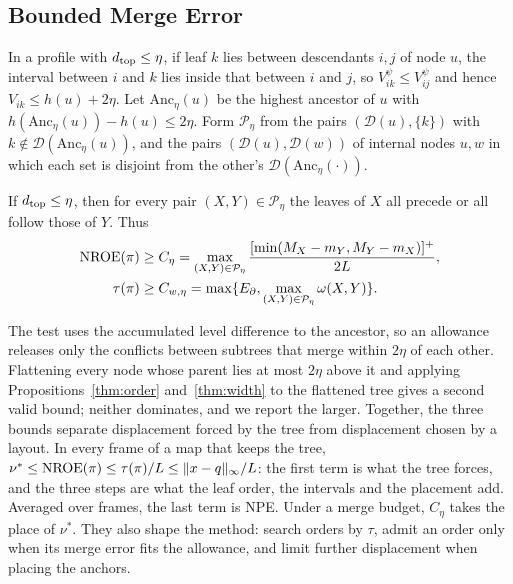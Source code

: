 \subsection{Bounded Merge Error}
In a profile with $d_{\mathrm{top}}\le\eta$, if leaf $k$ lies between descendants $i,j$ of node $u$, the interval between $i$ and $k$ lies inside that between $i$ and $j$, so $V_{ik}^{\psi}\le V_{ij}^{\psi}$ and hence $V_{ik}\le h(u)+2\eta$. Let $\mathrm{Anc}_\eta(u)$ be the highest ancestor of $u$ with $h(\mathrm{Anc}_\eta(u))-h(u)\le2\eta$. Form $\mathcal P_\eta$ from the pairs $(\mathcal D(u),\{k\})$ with $k\notin\mathcal D(\mathrm{Anc}_\eta(u))$, and the pairs $(\mathcal D(u),\mathcal D(w))$ of internal nodes $u,w$ in which each set is disjoint from the other's $\mathcal D(\mathrm{Anc}_\eta(\cdot))$.
\begin{proposition}\label{thm:chain}
If $d_{\mathrm{top}}\le\eta$, then for every pair $(X,Y)\in\mathcal P_\eta$ the leaves of $X$ all precede or all follow those of $Y$. Thus
\begin{equation}\label{eq:chainbounds}
\begin{split}
\mathrm{NROE}(\pi)&\ge C_\eta=\max_{(X,Y)\in\mathcal P_\eta}\frac{[\min(M_X-m_Y,M_Y-m_X)]^+}{2L},\\
\tau(\pi)&\ge C_{w,\eta}=\max\{E_\partial,\max_{(X,Y)\in\mathcal P_\eta}\omega(X,Y)\}.
\end{split}
\end{equation}
\end{proposition}
The test uses the accumulated level difference to the ancestor, so an allowance releases only the conflicts between subtrees that merge within $2\eta$ of each other. Flattening every node whose parent lies at most $2\eta$ above it and applying Propositions~\ref{thm:order} and~\ref{thm:width} to the flattened tree gives a second valid bound; neither dominates, and we report the larger. Together, the three bounds separate displacement forced by the tree from displacement chosen by a layout. In every frame of a map that keeps the tree, $\nu^*\le\mathrm{NROE}(\pi)\le\tau(\pi)/L\le\|x-q\|_\infty/L$: the first term is what the tree forces, and the three steps are what the leaf order, the intervals and the placement add. Averaged over frames, the last term is NPE. Under a merge budget, $C_\eta$ takes the place of $\nu^*$. They also shape the method: search orders by $\tau$, admit an order only when its merge error fits the allowance, and limit further displacement when placing the anchors.
